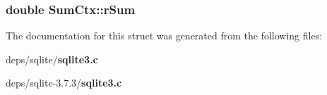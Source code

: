\subsubsection{\setlength{\rightskip}{0pt plus 5cm}double \bf{Sum\-Ctx::r\-Sum}}\label{structSumCtx_1fbc2636e87cc68cc6bdff56cde27bce}




The documentation for this struct was generated from the following files:\begin{CompactItemize}
\item 
deps/sqlite/\bf{sqlite3.c}\item 
deps/sqlite-3.7.3/\bf{sqlite3.c}\end{CompactItemize}
